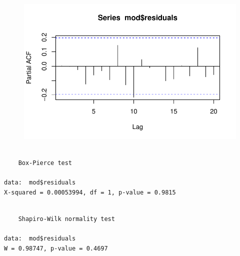 \documentclass[
  letterpaper,
  DIV=11,
  numbers=noendperiod]{scrartcl}
\newenvironment{Shaded}{\begin{snugshade}}{\end{snugshade}}
\newcommand{\FunctionTok}[1]{\textcolor[rgb]{0.28,0.35,0.67}{#1}}
\newcommand{\NormalTok}[1]{\textcolor[rgb]{0.00,0.23,0.31}{#1}}
\newcommand{\SpecialCharTok}[1]{\textcolor[rgb]{0.37,0.37,0.37}{#1}}
\theoremstyle{plain}
\theoremstyle{plain}
\theoremstyle{definition}
\theoremstyle{definition}
\theoremstyle{remark}
\begin{document}
\begin{Shaded}
\end{Shaded}

\begin{figure}[H]

{\centering \includegraphics{intervencao_files/figure-pdf/unnamed-chunk-8-3.pdf}

}

\end{figure}

\begin{Shaded}
\end{Shaded}

\begin{verbatim}

    Box-Pierce test

data:  mod$residuals
X-squared = 0.00053994, df = 1, p-value = 0.9815
\end{verbatim}

\begin{Shaded}
\end{Shaded}

\begin{verbatim}

    Shapiro-Wilk normality test

data:  mod$residuals
W = 0.98747, p-value = 0.4697
\end{verbatim}
\end{document}
